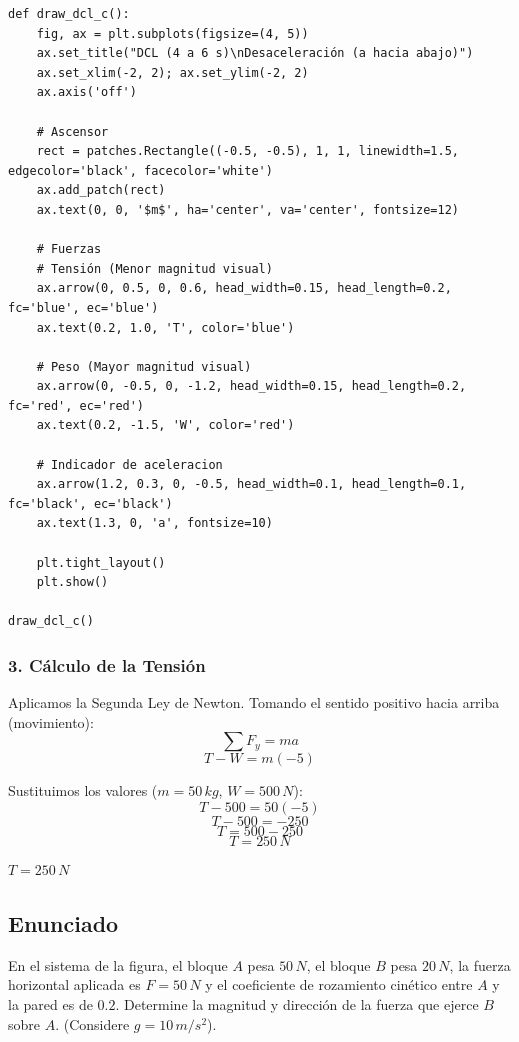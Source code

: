 \documentclass[12pt, a4paper]{article}
\begin{document}
\begin{lstlisting}
def draw_dcl_c():
    fig, ax = plt.subplots(figsize=(4, 5))
    ax.set_title("DCL (4 a 6 s)\nDesaceleración (a hacia abajo)")
    ax.set_xlim(-2, 2); ax.set_ylim(-2, 2)
    ax.axis('off')
    
    # Ascensor
    rect = patches.Rectangle((-0.5, -0.5), 1, 1, linewidth=1.5, edgecolor='black', facecolor='white')
    ax.add_patch(rect)
    ax.text(0, 0, '$m$', ha='center', va='center', fontsize=12)
    
    # Fuerzas
    # Tensión (Menor magnitud visual)
    ax.arrow(0, 0.5, 0, 0.6, head_width=0.15, head_length=0.2, fc='blue', ec='blue')
    ax.text(0.2, 1.0, 'T', color='blue')
    
    # Peso (Mayor magnitud visual)
    ax.arrow(0, -0.5, 0, -1.2, head_width=0.15, head_length=0.2, fc='red', ec='red')
    ax.text(0.2, -1.5, 'W', color='red')
    
    # Indicador de aceleracion
    ax.arrow(1.2, 0.3, 0, -0.5, head_width=0.1, head_length=0.1, fc='black', ec='black')
    ax.text(1.3, 0, 'a', fontsize=10)

    plt.tight_layout()
    plt.show()

draw_dcl_c()
\end{lstlisting}

\subsubsection*{3. Cálculo de la Tensión}
Aplicamos la Segunda Ley de Newton. Tomando el sentido positivo hacia arriba (movimiento):
$$ \sum F_y = m a $$
$$ T - W = m (-5) $$

Sustituimos los valores ($m=50\,\si{kg}$, $W=500\,\si{N}$):
$$ T - 500 = 50(-5) $$
$$ T - 500 = -250 $$
$$ T = 500 - 250 $$
$$ \boxed{T = 250 \, \si{N}} $$

\begin{tcolorbox}[colback=green!5!white, colframe=green!50!black, title=Respuesta Final]
\centering \Large $T = 250 \, \si{N}$
\end{tcolorbox}

\newpage

\subsection*{Enunciado}
En el sistema de la figura, el bloque $A$ pesa $50 \, \si{N}$, el bloque $B$ pesa $20 \, \si{N}$, la fuerza horizontal aplicada es $F = 50 \, \si{N}$ y el coeficiente de rozamiento cinético entre $A$ y la pared es de $0.2$. Determine la magnitud y dirección de la fuerza que ejerce $B$ sobre $A$. (Considere $g=10\,\si{m/s^2}$).
\end{document}
